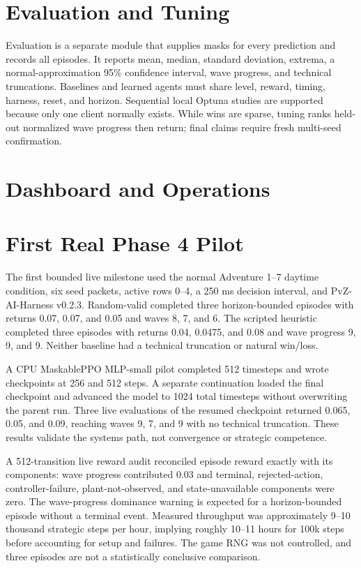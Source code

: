 \documentclass[11pt,a4paper]{article}
\begin{document}
\section{Evaluation and Tuning}
Evaluation is a separate module that supplies masks for every prediction and records all episodes. It reports mean, median, standard deviation, extrema, a normal-approximation 95\% confidence interval, wave progress, and technical truncations. Baselines and learned agents must share level, reward, timing, harness, reset, and horizon. Sequential local Optuna studies are supported because only one client normally exists. While wins are sparse, tuning ranks held-out normalized wave progress then return; final claims require fresh multi-seed confirmation.

\section{Dashboard and Operations}

\section{First Real Phase 4 Pilot}
The first bounded live milestone used the normal Adventure 1--7 daytime
condition, six seed packets, active rows 0--4, a 250 ms decision interval, and
PvZ-AI-Harness v0.2.3. Random-valid completed three horizon-bounded episodes
with returns 0.07, 0.07, and 0.05 and waves 8, 7, and 6. The scripted heuristic
completed three episodes with returns 0.04, 0.0475, and 0.08 and wave progress
9, 9, and 9. Neither baseline had a technical truncation or natural win/loss.

A CPU MaskablePPO MLP-small pilot completed 512 timesteps and wrote checkpoints
at 256 and 512 steps. A separate continuation loaded the final checkpoint and
advanced the model to 1024 total timesteps without overwriting the parent run.
Three live evaluations of the resumed checkpoint returned 0.065, 0.05, and
0.09, reaching waves 9, 7, and 9 with no technical truncation. These results
validate the systems path, not convergence or strategic competence.

A 512-transition live reward audit reconciled episode reward exactly with its
components: wave progress contributed 0.03 and terminal, rejected-action,
controller-failure, plant-not-observed, and state-unavailable components were
zero. The wave-progress dominance warning is expected for a horizon-bounded
episode without a terminal event. Measured throughput was approximately
9--10 thousand strategic steps per hour, implying roughly 10--11 hours for
100k steps before accounting for setup and failures. The game RNG was not
controlled, and three episodes are not a statistically conclusive comparison.
\end{document}
